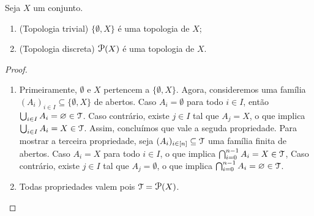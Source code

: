 \begin{prop}
	Seja $X$ um conjunto.
	\begin{enumerate}
	\item (Topologia trivial) $\{\emptyset,X\}$ é uma topologia de $X$;
	\item (Topologia discreta) $\p(X)$ é uma topologia de $X$.
	\end{enumerate}
\end{prop}
\begin{proof}
	\begin{enumerate}
	\item Primeiramente, $\emptyset$ e $X$ pertencem a $\{\emptyset,X\}$. Agora, consideremos uma família $(A_i)_{i \in I} \subseteq \{\emptyset,X\}$ de abertos. Caso $A_i = \emptyset$ para todo $i \in I$, então $\bigcup_{i \in I} A_i = \varnothing \in \mathcal{T}$. Caso contrário, existe $j \in I$ tal que $A_j = X$, o que implica $\bigcup_{i \in I} A_i = X \in \mathcal{T}$. Assim, concluímos que vale a seguda propriedade. Para mostrar a terceira propriedade, seja $(A_i)_{i \in [n]} \subseteq \mathcal{T}$ uma família finita de abertos. Caso $A_i=X$ para todo $i \in I$, o que implica $\bigcap_{i=0}^{n-1} A_i = X \in \mathcal{T}$, Caso contrário, existe $j \in I$ tal que $A_j = \emptyset$, o que implica $\bigcap_{i=0}^{n-1} A_i = \varnothing \in \mathcal{T}$.

	\item Todas propriedades valem pois $\topo = \p(X)$.
\qedhere
	\end{enumerate}
\end{proof}


